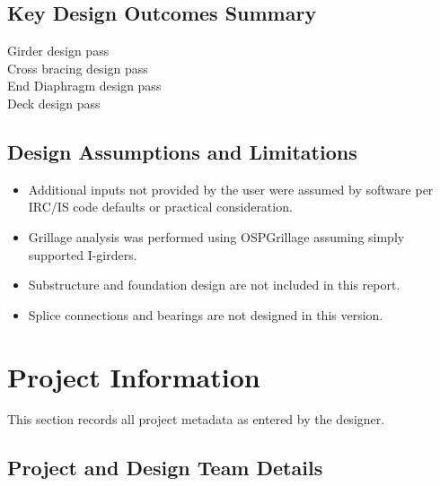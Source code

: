 \documentclass[12pt,a4paper]{report}
\numberwithin{table}{chapter}
\numberwithin{figure}{chapter}
\begin{document}
\section*{Key Design Outcomes Summary}
\label{sec:key-outcomes}

\noindent Girder design pass \\
Cross bracing design pass \\
End Diaphragm design pass \\
Deck design pass

\section*{Design Assumptions and Limitations}
\label{sec:assumptions}

\begin{itemize}
\item Additional inputs not provided by the user were assumed by software per IRC/IS code defaults or practical consideration.
\item Grillage analysis was performed using OSPGrillage assuming simply supported I-girders.
\item Substructure and foundation design are not included in this report.
\item Splice connections and bearings are not designed in this version.
\end{itemize}

\titleformat{\chapter}[block]{\normalfont\Large\bfseries\centering}{\thechapter}{1em}{}
\titlespacing*{\chapter}{0pt}{-30pt}{10pt}


\chapter{Project Information}

This section records all project metadata as entered by the designer.

\section{Project and Design Team Details}
\label{sec:project-details}
\end{document}
